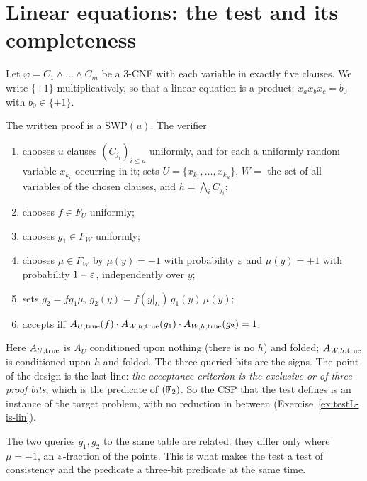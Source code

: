 \section{Linear equations: the test and its completeness}
\label{sec:lin}

Let $\varphi=C_1\wedge\dots\wedge C_m$ be a $3$-CNF with each variable in exactly five clauses.  We write $\{\pm1\}$ multiplicatively, so that a linear equation is a product: $x_ax_bx_c=b_0$ with $b_0\in\{\pm1\}$.

\begin{definition}\label{def:testL}
The written proof is a $\mathrm{SWP}(u)$.  The verifier
\begin{enumerate}[label=\arabic*.,leftmargin=*]
  \item chooses $u$ clauses $(C_{j_i})_{i\le u}$ uniformly, and for each a uniformly random variable $x_{k_i}$ occurring in it; sets $U=\{x_{k_1},\dots,x_{k_u}\}$, $W=$ the set of all variables of the chosen clauses, and $h=\bigwedge_iC_{j_i}$;
  \item chooses $f\in F_U$ uniformly;
  \item chooses $g_1\in F_W$ uniformly;
  \item chooses $\mu\in F_W$ by $\mu(y)=-1$ with probability $\varepsilon$ and $\mu(y)=+1$ with probability $1-\varepsilon$, independently over $y$;
  \item sets $g_2=fg_1\mu$, \ie $g_2(y)=f(y|_U)\,g_1(y)\,\mu(y)$;
  \item accepts iff $A_{U;{\rm true}}(f)\cdot A_{W,h;{\rm true}}(g_1)\cdot A_{W,h;{\rm true}}(g_2)=1$.
\end{enumerate}
\end{definition}

\noindent
Here $A_{U;{\rm true}}$ is $A_U$ conditioned upon nothing (there is no $h$) and folded; $A_{W,h;{\rm true}}$ is conditioned upon $h$ and folded.  The three queried bits are the signs.  The point of the design is the last line: \emph{the acceptance criterion is the exclusive-or of three proof bits}, which is the predicate of $(\mathbb{F}_2)$.
So the CSP that the test defines is an instance of the target problem, with no reduction in between (Exercise~\ref{ex:testL-is-lin}).

The two queries $g_1,g_2$ to the same table are related: they differ only where $\mu=-1$, an $\varepsilon$-fraction of the points.  This is what makes the test a test of consistency and the predicate a three-bit predicate at the same time.

